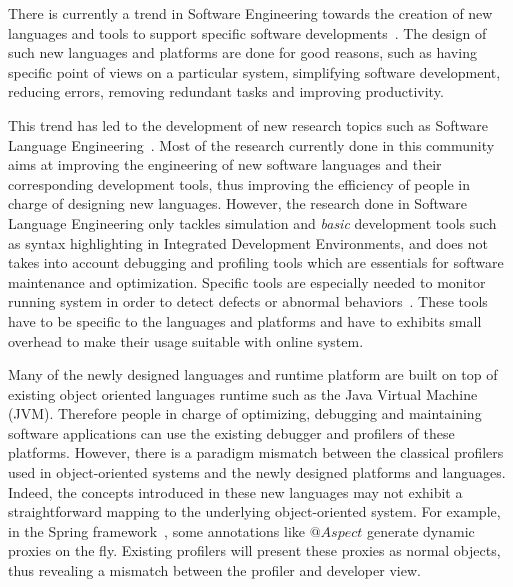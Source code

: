 
There is currently a trend in Software Engineering towards the creation of new languages and tools to support specific  software developments~\cite{whittle2014state, van2000domain,hutchinson2011empirical}. 
The design of such new languages and platforms are done for good reasons, such as  having specific point of views on a particular system, simplifying software development, reducing errors, removing redundant tasks and improving productivity. 

This trend has led to the development of new research topics such as Software Language Engineering~\cite{sle}. Most of the research currently done in this community aims at improving the engineering of new software languages and their corresponding development tools, thus improving the efficiency of people in charge of designing new languages. 
However, the research done in Software Language Engineering only tackles simulation and \textit{basic} development tools such as syntax highlighting in Integrated Development Environments, and does not takes into account debugging and profiling tools which are essentials for software maintenance and optimization.
Specific tools are especially needed to monitor running system in order to detect defects or abnormal behaviors~\cite{duesterwald2000software, Jovic:2011:CMY:2076021.2048081}.
These tools have to be specific to the languages and platforms and have to exhibits small overhead to make their usage suitable with online system.

Many of the newly designed languages and runtime platform are built on top of existing object oriented languages runtime such as the Java Virtual Machine (JVM). 
Therefore people in charge of optimizing, debugging and maintaining software applications can use the existing debugger and profilers of these platforms. 
However, there is a paradigm mismatch between the classical profilers used in object-oriented systems and the newly designed platforms and languages. 
Indeed, the concepts introduced in these new languages may not exhibit a straightforward mapping to the underlying object-oriented system. For example, in the Spring framework~\cite{laddad2009aspectj}, some annotations like $@Aspect$ generate dynamic proxies on the fly. Existing profilers will present these proxies as normal objects, thus revealing a mismatch between the profiler and developer view. 

